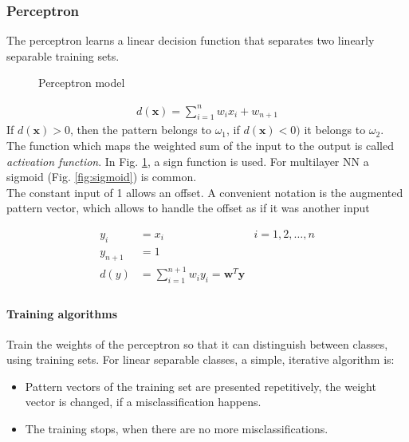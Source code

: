 \subsubsection{Perceptron}
The perceptron learns a linear decision function that separates two linearly separable training sets.

\begin{figure}[htb]
\centering
{}
\caption{Perceptron model}
\label{fig:perceptron}
\end{figure}
\begin{align*}
d(\mathbf{x}) = \sum_{i=1}^nw_ix_i + w_{n+1}
\end{align*}
If $d(\mathbf{x}) > 0$, then the pattern belongs to $\omega_1$, if  $d(\mathbf{x}) < 0)$ it belongs to $\omega_2$. \\

The function which maps the weighted sum of the input to the output is called \emph{activation function}.
In Fig. \ref{fig:perceptron}, a sign function is used.
For multilayer NN a sigmoid (Fig. \ref{fig:sigmoid}) is common. \\

The constant input of 1 allows an offset.
A convenient notation is the augmented pattern vector, which allows to handle the offset as if it was another input

\begin{align*}
y_i &= x_i & i=1,2,\dots,n \\
y_{n+1} &= 1 \\
d(y) &= \sum_{i=1}^{n+1}w_iy_i = \mathbf{w}^T\mathbf{y} \\
\end{align*}

\paragraph{Training algorithms}
Train the weights of the perceptron so that it can distinguish between classes, using training sets.
For linear separable classes, a simple, iterative algorithm is:
\begin{itemize}
\item
Pattern vectors of the training set are presented repetitively, the weight vector is changed, if a misclassification happens.
\item The training stops, when there are no more misclassifications.
\end{itemize}

